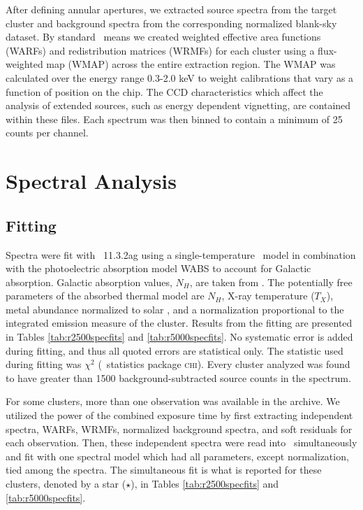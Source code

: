 After defining annular apertures, we extracted source spectra from the
target cluster and background spectra from the corresponding
normalized blank-sky dataset. By standard \ciao\ means we created
weighted effective area functions (WARFs) and redistribution matrices
(WRMFs) for each cluster using a flux-weighted map (WMAP) across the
entire extraction region. The WMAP was calculated over the energy
range 0.3-2.0 keV to weight calibrations that vary as a function of
position on the chip. The CCD characteristics which affect the
analysis of extended sources, such as energy dependent vignetting, are
contained within these files. Each spectrum was then binned to contain
a minimum of 25 counts per channel.

\section{Spectral Analysis}
\label{sec:ebandspecan}

\subsection{Fitting}
\label{sec:ebandfitting}

Spectra were fit with \xspec\ 11.3.2ag \citep{xspec} using a
single-temperature \mekal\ model in combination with the photoelectric
absorption model {\textsc{WABS}} \citep{wabs} to account for Galactic
absorption. Galactic absorption values, $N_{H}$, are taken from
\citet{dickeylockman}. The potentially free parameters of the absorbed
thermal model are $N_{H}$, X-ray temperature ($T_{X}$), metal
abundance normalized to solar \citep[elemental ratios taken
  from][]{ag89}, and a normalization proportional to the integrated
emission measure of the cluster. Results from the fitting are
presented in Tables \ref{tab:r2500specfits} and
\ref{tab:r5000specfits}. No systematic error is added during fitting,
and thus all quoted errors are statistical only. The statistic used
during fitting was $\chi^2$ (\xspec\ statistics package
\textsc{chi}). Every cluster analyzed was found to have greater than
1500 background-subtracted source counts in the spectrum.

For some clusters, more than one observation was available in the
archive. We utilized the power of the combined exposure time by first
extracting independent spectra, WARFs, WRMFs, normalized background
spectra, and soft residuals for each observation. Then, these
independent spectra were read into \xspec\ simultaneously and fit with
one spectral model which had all parameters, except normalization,
tied among the spectra. The simultaneous fit is what is reported for
these clusters, denoted by a star ($\star$), in Tables
\ref{tab:r2500specfits} and \ref{tab:r5000specfits}.

